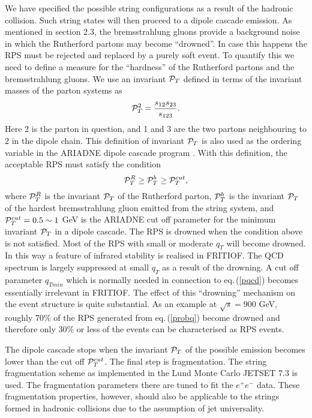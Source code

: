We have specified the possible string configurations as a result of
the hadronic collision.  Such string states will then proceed to
a dipole cascade emission.   As mentioned in section 2.3, the bremsstrahlung
gluons provide a background noise in which the Rutherford partons may
become ``drowned''.  In case this happens the RPS must be rejected
and replaced by a purely soft event.  To quantify this we need to define
a measure for the ``hardness'' of the Rutherford partons and the bremsstrahlung
gluons.  We use an invariant ${\cal P}_T$ defined in terms of the invariant masses
of the parton systems as
\begin{equation}
\label{invpt}
{\cal P}_T^2 = {{s_{12}s_{23}}\over{s_{123}}}.
\end{equation}
Here 2 is the parton in question, and 1 and 3 are the two partons neighbouring
to 2 in the dipole chain.  This definition of invariant ${\cal P}_T$ is also used
as the ordering variable in the ARIADNE dipole cascade program \cite{aria}.
With this definition, the acceptable RPS must satisfy the condition
\begin{equation}
\label{rpsok}
{\cal P}_T^R \geq {\cal P}_T^b \geq {\cal P}_T^{cut},
\end{equation}
where ${\cal P}_T^R$ is the invariant ${\cal P}_T$ of the Rutherford parton, 
${\cal P}_T^b$ is the invariant ${\cal P}_T$ of the hardest bremsstrahlung gluon emitted
from the string system, and ${\cal P}_T^{cut} = 0.5\sim 1$ GeV is the ARIADNE 
cut off parameter for the minimum invariant ${\cal P}_T$ in a dipole cascade.
The RPS is drowned when the condition above
is not satisfied.  Most of the RPS with small or moderate $q_T$ will become 
drowned.  In this way a feature of infrared stability is realised in FRITIOF.
The QCD spectrum is largely suppressed at small $q_T$ 
as a result of the drowning.
A cut off parameter $q_{Tmin}$ which is normally needed in connection
to eq.\,(\ref{pqcd}) becomes essentially irrelevant in FRITIOF.  
The effect of this ``drowning'' mechanism on the event structure 
is quite substantial.  As an example
at $\sqrt{s}=900$ GeV, roughly 70\% of the RPS generated from eq.\,(\ref{probq})
become drowned and therefore only 30\% or less of the events can be characterised
as RPS events.  

The dipole cascade stops when the invariant ${\cal P}_T$ of the possible emission 
becomes lower than the cut off ${\cal P}_T^{cut}$.  
The final step is fragmentation.  The string fragmentation scheme \cite{lstri}
as implemented
in the Lund Monte Carlo JETSET 7.3 \cite{j73} is used.  
The fragmentation parameters
there are tuned to fit the $e^+e^-$ data.  These fragmentation properties,
however, should also be applicable to the strings formed in hadronic collisions
due to the assumption of jet universality.


